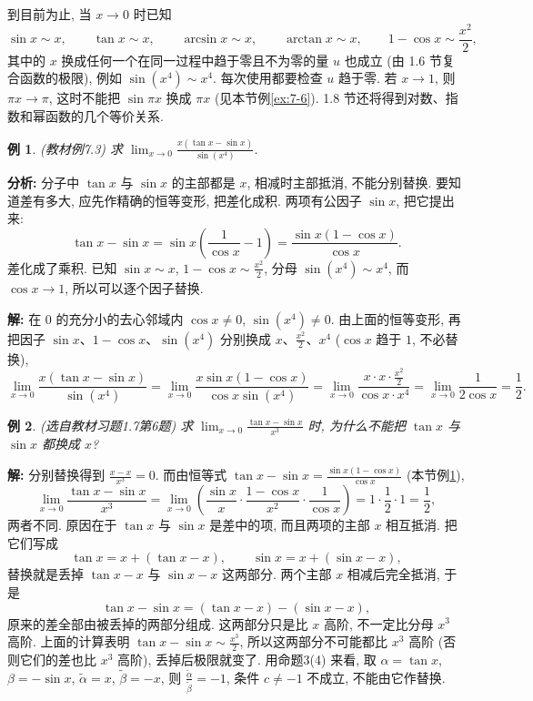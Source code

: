 \documentclass[UTF8,openany]{ctexbook}
\theoremstyle{chinesetextbook}
\newtheorem{example}{例}[section]
\newenvironment{cnsolution}{\par\indent\textbf{解:} \ignorespaces}{\par}
\begin{document}
到目前为止, 当 $x\to0$ 时已知
\[
\sin x\sim x,\qquad\tan x\sim x,\qquad\arcsin x\sim x,\qquad\arctan x\sim x,\qquad1-\cos x\sim\frac{x^2}2,
\]
其中的 $x$ 换成任何一个在同一过程中趋于零且不为零的量 $u$ 也成立 (由 1.6 节复合函数的极限), 例如 $\sin(x^4)\sim x^4$. 每次使用都要检查 $u$ 趋于零. 若 $x\to1$, 则 $\pi x\to\pi$, 这时不能把 $\sin\pi x$ 换成 $\pi x$ (见本节例\ref{ex:7-6}). 1.8 节还将得到对数、指数和幂函数的几个等价关系.
\begin{example}\label{ex:7-3}
\textnormal{(教材例7.3)} 求 $\displaystyle\lim_{x\to0}\frac{x(\tan x-\sin x)}{\sin(x^4)}$.
\end{example}
\par\indent\textbf{分析:} 分子中 $\tan x$ 与 $\sin x$ 的主部都是 $x$, 相减时主部抵消, 不能分别替换. 要知道差有多大, 应先作精确的恒等变形, 把差化成积. 两项有公因子 $\sin x$, 把它提出来:
\[
\tan x-\sin x=\sin x\left(\frac1{\cos x}-1\right)=\frac{\sin x(1-\cos x)}{\cos x}.
\]
差化成了乘积. 已知 $\sin x\sim x$, $\displaystyle1-\cos x\sim\frac{x^2}2$, 分母 $\sin(x^4)\sim x^4$, 而 $\cos x\to1$, 所以可以逐个因子替换.
\begin{cnsolution}
在 $0$ 的充分小的去心邻域内 $\cos x\ne0$, $\sin(x^4)\ne0$. 由上面的恒等变形, 再把因子 $\sin x$、$1-\cos x$、$\sin(x^4)$ 分别换成 $x$、$\displaystyle\frac{x^2}2$、$x^4$ ($\cos x$ 趋于 $1$, 不必替换),
\[
\lim_{x\to0}\frac{x(\tan x-\sin x)}{\sin(x^4)}=\lim_{x\to0}\frac{x\sin x(1-\cos x)}{\cos x\sin(x^4)}=\lim_{x\to0}\frac{x\cdot x\cdot\frac{x^2}2}{\cos x\cdot x^4}=\lim_{x\to0}\frac1{2\cos x}=\frac12.
\]
\end{cnsolution}
\begin{example}\label{ex:h17-6}
\textnormal{(选自教材习题1.7第6题)} 求 $\displaystyle\lim_{x\to0}\frac{\tan x-\sin x}{x^3}$ 时, 为什么不能把 $\tan x$ 与 $\sin x$ 都换成 $x$?
\end{example}
\begin{cnsolution}
分别替换得到 $\displaystyle\frac{x-x}{x^3}=0$. 而由恒等式 $\displaystyle\tan x-\sin x=\frac{\sin x(1-\cos x)}{\cos x}$ (本节例\ref{ex:7-3}),
\[
\lim_{x\to0}\frac{\tan x-\sin x}{x^3}=\lim_{x\to0}\left(\frac{\sin x}x\cdot\frac{1-\cos x}{x^2}\cdot\frac1{\cos x}\right)=1\cdot\frac12\cdot1=\frac12,
\]
两者不同. 原因在于 $\tan x$ 与 $\sin x$ 是差中的项, 而且两项的主部 $x$ 相互抵消. 把它们写成
\[
\tan x=x+(\tan x-x),\qquad\sin x=x+(\sin x-x),
\]
替换就是丢掉 $\tan x-x$ 与 $\sin x-x$ 这两部分. 两个主部 $x$ 相减后完全抵消, 于是
\[
\tan x-\sin x=(\tan x-x)-(\sin x-x),
\]
原来的差全部由被丢掉的两部分组成. 这两部分只是比 $x$ 高阶, 不一定比分母 $x^3$ 高阶. 上面的计算表明 $\displaystyle\tan x-\sin x\sim\frac{x^3}2$, 所以这两部分不可能都比 $x^3$ 高阶 (否则它们的差也比 $x^3$ 高阶), 丢掉后极限就变了. 用命题3(4) 来看, 取 $\alpha=\tan x$, $\beta=-\sin x$, $\widetilde\alpha=x$, $\widetilde\beta=-x$, 则 $\displaystyle\frac{\widetilde\alpha}{\widetilde\beta}=-1$, 条件 $c\ne-1$ 不成立, 不能由它作替换.
\end{cnsolution}
\end{document}

